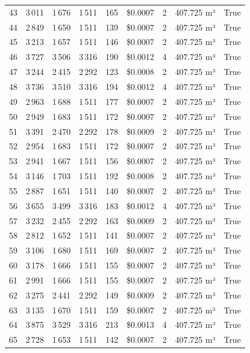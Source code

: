 \documentclass[a4paper,11pt]{article}
\begin{document}
\begin{table}[ht]
\begin{tabular}{r r r r r r r p{3cm} l}
43 & 3\,011 & 1\,676 & 1\,511 & 165 & \$0.0007 & 2 & 407.725 m³ & True \\
44 & 2\,849 & 1\,650 & 1\,511 & 139 & \$0.0007 & 2 & 407.725 m³ & True \\
45 & 3\,213 & 1\,657 & 1\,511 & 146 & \$0.0007 & 2 & 407.725 m³ & True \\
46 & 3\,727 & 3\,506 & 3\,316 & 190 & \$0.0012 & 4 & 407.725 m³ & True \\
47 & 3\,244 & 2\,415 & 2\,292 & 123 & \$0.0008 & 2 & 407.725 m³ & True \\
48 & 3\,736 & 3\,510 & 3\,316 & 194 & \$0.0012 & 4 & 407.725 m³ & True \\
49 & 2\,963 & 1\,688 & 1\,511 & 177 & \$0.0007 & 2 & 407.725 m³ & True \\
50 & 2\,949 & 1\,683 & 1\,511 & 172 & \$0.0007 & 2 & 407.725 m³ & True \\
51 & 3\,391 & 2\,470 & 2\,292 & 178 & \$0.0009 & 2 & 407.725 m³ & True \\
52 & 2\,954 & 1\,683 & 1\,511 & 172 & \$0.0007 & 2 & 407.725 m³ & True \\
53 & 2\,941 & 1\,667 & 1\,511 & 156 & \$0.0007 & 2 & 407.725 m³ & True \\
54 & 3\,146 & 1\,703 & 1\,511 & 192 & \$0.0008 & 2 & 407.725 m³ & True \\
55 & 2\,887 & 1\,651 & 1\,511 & 140 & \$0.0007 & 2 & 407.725 m³ & True \\
56 & 3\,655 & 3\,499 & 3\,316 & 183 & \$0.0012 & 4 & 407.725 m³ & True \\
57 & 3\,232 & 2\,455 & 2\,292 & 163 & \$0.0009 & 2 & 407.725 m³ & True \\
58 & 2\,812 & 1\,652 & 1\,511 & 141 & \$0.0007 & 2 & 407.725 m³ & True \\
59 & 3\,106 & 1\,680 & 1\,511 & 169 & \$0.0007 & 2 & 407.725 m³ & True \\
60 & 3\,178 & 1\,666 & 1\,511 & 155 & \$0.0007 & 2 & 407.725 m³ & True \\
61 & 2\,991 & 1\,666 & 1\,511 & 155 & \$0.0007 & 2 & 407.725 m³ & True \\
62 & 3\,275 & 2\,441 & 2\,292 & 149 & \$0.0009 & 2 & 407.725 m³ & True \\
63 & 3\,135 & 1\,670 & 1\,511 & 159 & \$0.0007 & 2 & 407.725 m³ & True \\
64 & 3\,875 & 3\,529 & 3\,316 & 213 & \$0.0013 & 4 & 407.725 m³ & True \\
65 & 2\,728 & 1\,653 & 1\,511 & 142 & \$0.0007 & 2 & 407.725 m³ & True \\

\end{tabular}
\end{table}
\end{document}
